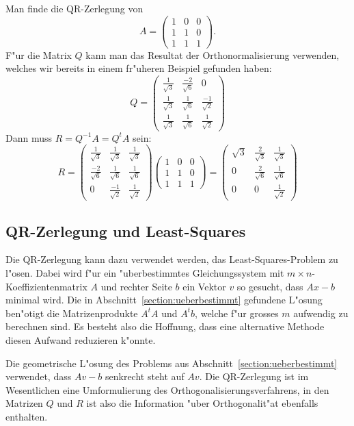 \begin{beispiel}
Man finde die QR-Zerlegung von 
\[
A=\begin{pmatrix}1&0&0\\1&1&0\\1&1&1\end{pmatrix}.
\]
F"ur die Matrix $Q$ kann man das Resultat der Orthonormalisierung
verwenden, welches wir bereits in einem fr"uheren Beispiel gefunden
haben:
\[
Q=
\begin{pmatrix}
\frac1{\sqrt{3}}&\frac{-2}{\sqrt{6}}&0\\
\frac1{\sqrt{3}}&\frac{1}{\sqrt{6}}&\frac{-1}{\sqrt{2}}\\
\frac1{\sqrt{3}}&\frac{1}{\sqrt{6}}&\frac{1}{\sqrt{2}}
\end{pmatrix}
\]
Dann muss $R=Q^{-1}A=Q^tA$ sein:
\[
R=
\begin{pmatrix}
\frac1{\sqrt{3}}&\frac1{\sqrt{3}}&\frac1{\sqrt{3}}\\
\frac{-2}{\sqrt{6}}&\frac{1}{\sqrt{6}}&\frac{1}{\sqrt{6}}\\
0&\frac{-1}{\sqrt{2}}&\frac{1}{\sqrt{2}}
\end{pmatrix}
\begin{pmatrix}1&0&0\\1&1&0\\1&1&1\end{pmatrix}
=
\begin{pmatrix}
\sqrt{3}&\frac{2}{\sqrt{3}}&\frac{1}{\sqrt{3}}\\
0&\frac2{\sqrt{6}}&\frac1{\sqrt{6}}\\
0&0&\frac1{\sqrt{2}}
\end{pmatrix}
\]
\end{beispiel}

\subsection{QR-Zerlegung und Least-Squares}
Die QR-Zerlegung kann dazu verwendet werden, das Least-Squares-Problem
zu l"osen.
Dabei wird f"ur ein "uberbestimmtes Gleichungssystem mit
$m\times n$-Koeffizienten\-matrix $A$ und rechter Seite $b$ ein Vektor $v$
so gesucht,
dass $Ax-b$ minimal wird.
Die in Abschnitt~\ref{section:ueberbestimmt}
gefundene L"osung ben"otigt die Matrizenprodukte $A^tA$ und $A^tb$, welche
f"ur grosses $m$ aufwendig zu berechnen sind.
Es besteht also die Hoffnung,
dass eine alternative Methode diesen Aufwand reduzieren k"onnte.

Die geometrische L"osung des Problems aus Abschnitt~\ref{section:ueberbestimmt}
verwendet, dass $Av-b$ senkrecht steht auf $Av$.
Die QR-Zerlegung ist
im Wesentlichen eine Umformulierung des Orthogonalisierungsverfahrens, in den
Matrizen $Q$ und $R$ ist also die Information "uber Orthogonalit"at ebenfalls
enthalten.

